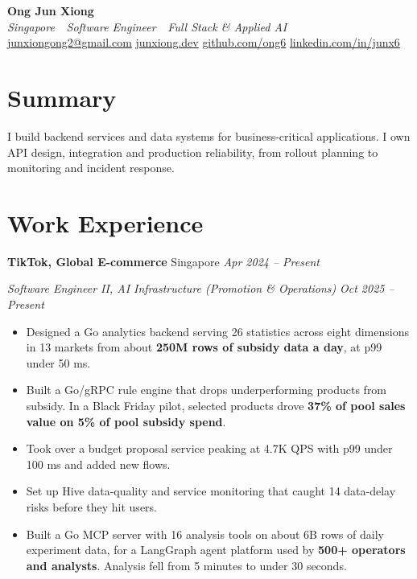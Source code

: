 \documentclass[11pt,a4paper]{article}
\newcommand{\subentry}[2]{%
  \vspace{2pt}
  \noindent\textit{#1} \hfill \textit{#2}
}
\newcommand{\companyheader}[3]{%
  \vspace{4pt}
  \noindent\textbf{#1} \hfill \textnormal{#2} \enspace\textbar\enspace \textit{#3}
}
\begin{document}
\begin{center}
  {\Large\bfseries Ong Jun Xiong} \\[2pt]
  {\small\itshape Singapore \,\textbar\, Software Engineer \,\textbar\, Full Stack \& Applied AI} \\[3pt]
  \small
  \href{mailto:junxiongong2@gmail.com}{junxiongong2@gmail.com} \enspace\textbar\enspace
  \href{https://www.junxiong.dev}{junxiong.dev} \enspace\textbar\enspace
  \href{https://github.com/ong6}{github.com/ong6} \enspace\textbar\enspace
  \href{https://linkedin.com/in/junx6}{linkedin.com/in/junx6}
\end{center}

\section{Summary}
\vspace{3pt}
\noindent I build backend services and data systems for business-critical applications. I own API design, integration and production reliability, from rollout planning to monitoring and incident response.

\section{Work Experience}

\companyheader{TikTok, Global E-commerce}{Singapore}{Apr 2024 -- Present}

\subentry{Software Engineer II, AI Infrastructure (Promotion \& Operations)}{Oct 2025 -- Present}
\begin{itemize}
  \item Designed a Go analytics backend serving 26 statistics across eight dimensions in 13 markets from about \textbf{250M rows of subsidy data a day}, at p99 under 50 ms.
  \item Built a Go/gRPC rule engine that drops underperforming products from subsidy. In a Black Friday pilot, selected products drove \textbf{37\% of pool sales value on 5\% of pool subsidy spend}.
  \item Took over a budget proposal service peaking at 4.7K QPS with p99 under 100 ms and added new flows.
  \item Set up Hive data-quality and service monitoring that caught 14 data-delay risks before they hit users.
  \item Built a Go MCP server with 16 analysis tools on about 6B rows of daily experiment data, for a LangGraph agent platform used by \textbf{500+ operators and analysts}. Analysis fell from 5 minutes to under 30 seconds.
\end{itemize}
\end{document}
